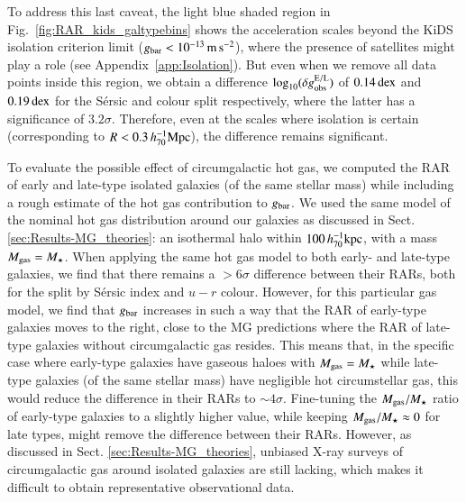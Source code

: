 \documentclass{aa}
\newcommand{\hkpc}{\,h_{70}^{-1}{\rm{kpc}} }
\newcommand{\hMpc}{\,h_{70}^{-1}{\rm{Mpc}} }
\newcommand{\mpss}{\,{\rm m}\,{\rm s}^{-2} }
\newcommand{\dex}{\,{\rm dex}}
\newcommand{\un}[1]{_{\rm #1}}
\begin{document}
To address this last caveat, the light blue shaded region in Fig.~\ref{fig:RAR_kids_galtypebins} shows the acceleration scales beyond the KiDS isolation criterion limit ($g\un{bar}<10^{-13}\mpss$), where the presence of satellites might play a role (see Appendix~\ref{app:Isolation}). But even when we remove all data points inside this region, we obtain a difference $\log_{10}(\delta g\un{obs}^{\rm E/L})$ of $0.14 \dex$ and $0.19 \dex$ for the S\'ersic and colour split respectively, where the latter has a significance of $3.2 \sigma$. Therefore, even at the scales where isolation is certain (corresponding to $R<0.3 \hMpc$), the difference remains significant.

To evaluate the possible effect of circumgalactic hot gas, we computed the RAR of early and late-type isolated galaxies (of the same stellar mass) while including a rough estimate of the hot gas contribution to $g\un{bar}$. We used the same model of the nominal hot gas distribution around our galaxies as discussed in Sect. \ref{sec:Results-MG_theories}: an isothermal halo within $100 \hkpc$, with a mass $M\un{gas} = M_\star$. When applying the same hot gas model to both early- and late-type galaxies, we find that there remains a $>6 \sigma$ difference between their RARs, both for the split by S\'ersic index and $u-r$ colour. However, for this particular gas model, we find that $g\un{bar}$ increases in such a way that the RAR of early-type galaxies moves to the right, close to the MG predictions where the RAR of late-type galaxies without circumgalactic gas resides. This means that, in the specific case where early-type galaxies have gaseous haloes with $M\un{gas} = M_\star$ while late-type galaxies (of the same stellar mass) have negligible hot circumstellar gas, this would reduce the difference in their RARs to $\sim4\sigma$. Fine-tuning the $M\un{gas}/M_\star$ ratio of early-type galaxies to a slightly higher value, while keeping $M\un{gas}/M_\star\approx0$ for late types, might remove the difference between their RARs. However, as discussed in Sect. \ref{sec:Results-MG_theories}, unbiased X-ray surveys of circumgalactic gas around isolated galaxies are still lacking, which makes it difficult to obtain representative observational data.
\end{document}
